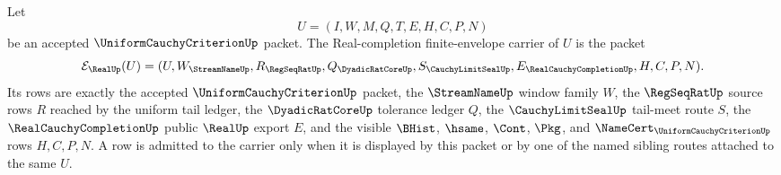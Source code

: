 \begin{definition}
\label{def:uniform-cauchy-criterion-real-completion-finite-envelope-carrier}
Let
$$
U=(I,W,M,Q,T,E,H,C,P,N)
$$
be an accepted $\UniformCauchyCriterionUp$ packet. The Real-completion finite-envelope carrier of $U$ is the packet
$$
\mathcal{E}_{\RealUp}(U)=
(U,W_{\StreamNameUp},R_{\RegSeqRatUp},Q_{\DyadicRatCoreUp},
S_{\CauchyLimitSealUp},E_{\RealCauchyCompletionUp},H,C,P,N).
$$
Its rows are exactly the accepted $\UniformCauchyCriterionUp$ packet, the $\StreamNameUp$ window family $W$, the $\RegSeqRatUp$ source rows $R$ reached by the uniform tail ledger, the $\DyadicRatCoreUp$ tolerance ledger $Q$, the $\CauchyLimitSealUp$ tail-meet route $S$, the $\RealCauchyCompletionUp$ public $\RealUp$ export $E$, and the visible $\BHist$, $\hsame$, $\Cont$, $\Pkg$, and $\NameCert_{\UniformCauchyCriterionUp}$ rows $H,C,P,N$. A row is admitted to the carrier only when it is displayed by this packet or by one of the named sibling routes attached to the same $U$.
\end{definition}

